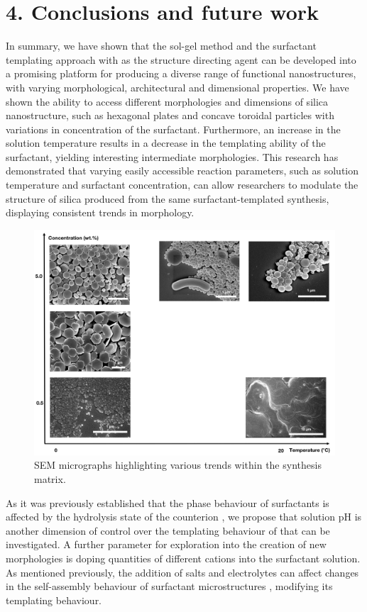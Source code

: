\documentclass[a4paper,12pt,twocolumn]{article}
\begin{document}
	 \section{4. Conclusions and future work}
	 
	 In summary, we have shown that the sol-gel method and the surfactant templating approach with  as the structure directing agent can be developed into a promising platform for producing a diverse range of functional nanostructures, with varying morphological, architectural and dimensional properties. We have shown the ability to access different morphologies and dimensions of silica nanostructure, such as hexagonal plates and concave toroidal particles with variations in concentration of the  surfactant. Furthermore, an increase in the solution temperature results in a decrease in the templating ability of the surfactant, yielding interesting intermediate morphologies. This research has demonstrated that varying easily accessible reaction parameters, such as solution temperature and surfactant concentration, can allow researchers to modulate the structure of silica produced from the same surfactant-templated synthesis, displaying consistent trends in morphology. 
	 
	 	\begin{figure}[!b]
  	 	\centering
		\includegraphics[width=\linewidth]{trends.jpg}
  		\caption{SEM micrographs highlighting various trends within the synthesis matrix.}
  	\end{figure}
	 
	As it was previously established that the phase behaviour of  surfactants is affected by the hydrolysis state of the counterion \cite{liu2014}, we propose that solution pH is another dimension of control over the templating behaviour of  that can be investigated. A further parameter for exploration into the creation of new morphologies is doping quantities of different cations into the surfactant solution. As mentioned previously, the addition of salts and electrolytes can affect changes in the self-assembly behaviour of surfactant microstructures \cite{thalberg1991}, modifying its templating behaviour.
	
\end{document}
